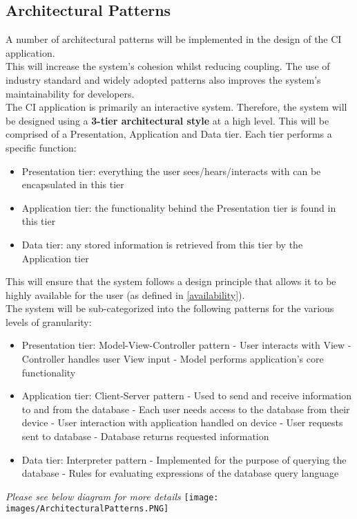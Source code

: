 \documentclass[11pt]{article}
\begin{document}
\subsection{Architectural Patterns}
A number of architectural patterns will be implemented in the design of the CI application.\\[0.5cm]
This will increase the system's cohesion whilst reducing coupling. The use of industry standard and widely adopted patterns also improves the system's maintainability for developers.\\[0.5cm]
The CI application is primarily an interactive system. Therefore, the system will be designed using a \textbf{3-tier architectural style} at a high level. This will be comprised of a Presentation, Application and Data tier. Each tier performs a specific function:
\begin{itemize}
    \item Presentation tier: everything the user sees/hears/interacts with can be encapsulated in this tier
    \item Application tier: the functionality behind the Presentation tier is found in this tier
    \item Data tier: any stored information is retrieved from this tier by the Application tier
\end{itemize}
This will ensure that the system follows a design principle that allows it to be highly available for the user (as defined in \ref{availability}).\\[0.5cm]

The system will be sub-categorized into the following patterns for the various levels of granularity:
\begin{itemize}
    \item Presentation tier: Model-View-Controller pattern
        \subitem - User interacts with View
        \subitem - Controller handles user View input
        \subitem - Model performs application's core functionality
    \item Application tier: Client-Server pattern
        \subitem - Used to send and receive information to and from the database
        \subitem - Each user needs access to the database from their device
        \subitem - User interaction with application handled on device
        \subitem - User requests sent to database
        \subitem - Database returns requested information
    \item Data tier: Interpreter pattern
        \subitem - Implemented for the purpose of querying the database
        \subitem - Rules for evaluating expressions of the database query language
\end{itemize}
\textit{Please see below diagram for more details}
\newpage
\texttt{[image: images/ArchitecturalPatterns.PNG]}
\newpage
\end{document}
